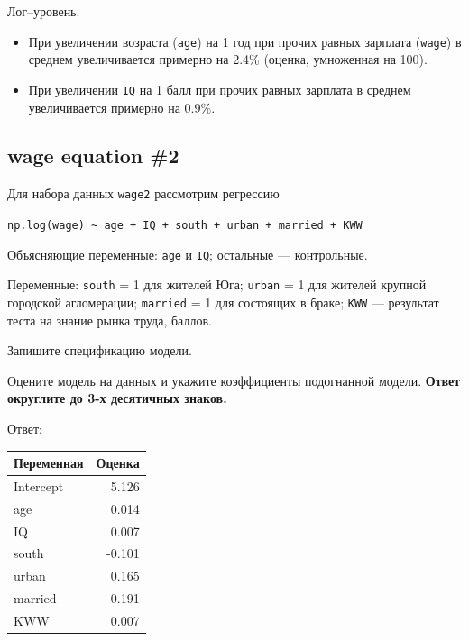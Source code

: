 \documentclass[
  russian,
]{article}
\newcounter{none} %
\providecommand{\tightlist}{%
  \setlength{\itemsep}{0pt}\setlength{\parskip}{0pt}}
\begin{document}
\begin{tcolorbox}[enhanced jigsaw, arc=.35mm, bottomrule=.15mm, bottomtitle=1mm, breakable, colback=white, colbacktitle=quarto-callout-tip-color!10!white, colframe=quarto-callout-tip-color-frame, coltitle=black, left=2mm, leftrule=.75mm, opacityback=0, opacitybacktitle=0.6, rightrule=.15mm, title=\textcolor{quarto-callout-tip-color}{\faLightbulb}\hspace{0.5em}{Ответ}, titlerule=0mm, toprule=.15mm, toptitle=1mm]

Лог--уровень.

\begin{itemize}
\tightlist
\item
  При увеличении возраста (\texttt{age}) на 1 год при прочих равных
  зарплата (\texttt{wage}) в среднем увеличивается примерно на 2.4\%
  (оценка, умноженная на 100).
\item
  При увеличении \texttt{IQ} на 1 балл при прочих равных зарплата в
  среднем увеличивается примерно на 0.9\%.
\end{itemize}

\end{tcolorbox}

\subsection{wage equation \#2}\label{wage-equation-2}

Для набора данных \texttt{wage2} рассмотрим регрессию

\texttt{np.log(wage)\ \textasciitilde{}\ age\ +\ IQ\ +\ south\ +\ urban\ +\ married\ +\ KWW}

Объясняющие переменные: \texttt{age} и \texttt{IQ}; остальные ---
контрольные.

Переменные: \texttt{south} = 1 для жителей Юга; \texttt{urban} = 1 для
жителей крупной городской агломерации; \texttt{married} = 1 для
состоящих в браке; \texttt{KWW} --- результат теста на знание рынка
труда, баллов.

Запишите спецификацию модели.

Оцените модель на данных и укажите коэффициенты подогнанной модели.
\textbf{Ответ округлите до 3-х десятичных знаков.}

Ответ:

{\def\LTcaptype{none} %
\begin{longtable}[]{@{}lr@{}}
\toprule\noalign{}
Переменная & Оценка \\
\midrule\noalign{}
\endhead
\bottomrule\noalign{}
\endlastfoot
Intercept & 5.126 \\
age & 0.014 \\
IQ & 0.007 \\
south & -0.101 \\
urban & 0.165 \\
married & 0.191 \\
KWW & 0.007 \\
\end{longtable}
}
\end{document}

